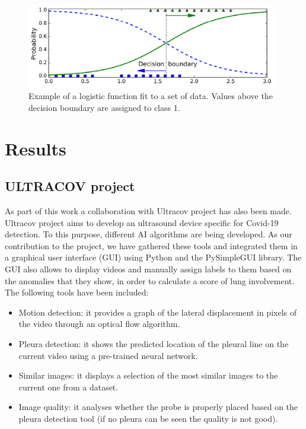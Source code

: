 \documentclass[11pt]{article} %
\begin{document}
	\begin{figure}
	\centering
	\includegraphics[width=11cm]{figuras/sigmoid.png}
	\caption{Example of a logistic function fit to a set of data. Values above the decision boundary are assigned to class 1. \cite{geron}}
	\end{figure}


\section{Results}

\subsection{ULTRACOV project}
	As part of this work a collaboration with Ultracov project has also been made. Ultracov project aims to develop an ultrasound device specific for Covid-19 detection. To this purpose, different AI algorithms are being developed. As our contribution to the project, we have gathered these tools and integrated them in a graphical user interface (GUI) using Python and the PySimpleGUI library. The GUI also allows to display videos and manually assign labels to them based on the anomalies that they show, in order to calculate a score of lung involvement. 
	The following tools have been included:
	\begin{itemize}
	\item Motion detection: it provides a graph of the lateral displacement in pixels of the video through an optical flow algorithm.
	\item Pleura detection: it shows the predicted location of the pleural line on the current video using a pre-trained neural network.
	\item Similar images: it displays a selection of the most similar images to the current one from a dataset.
	\item Image quality: it analyses whether the probe is properly placed based on the pleura detection tool (if no pleura can be seen the quality is not good).
	\end{itemize}
	
\end{document}
